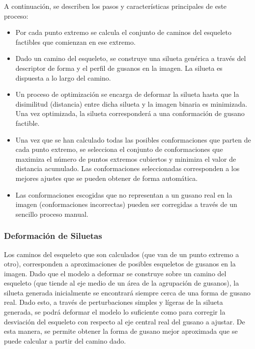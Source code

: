 A continuaci\'on, se describen los pasos y caracter\'isticas principales de este proceso:


\begin{itemize}
\item Por cada punto extremo se calcula el conjunto de caminos del esqueleto factibles
que comienzan en ese extremo.
\item Dado un camino del esqueleto, se construye una silueta gen\'erica a trav\'es
del descriptor de forma y el perfil de gusanos en la imagen. La silueta es dispuesta
a lo largo del camino.
\item Un proceso de optimizaci\'on se encarga de deformar la silueta hasta que la
disimilitud (distancia) entre dicha silueta y la imagen binaria es minimizada. Una
vez optimizada, la silueta corresponder\'a a una conformaci\'on de gusano factible.
\item Una vez que se han calculado todas las posibles conformaciones que parten 
de cada punto extremo, se selecciona el conjunto de conformaciones que maximiza
el n\'umero de puntos extremos cubiertos y minimiza el valor de distancia acumulado.
Las conformaciones seleccionadas corresponden a los mejores ajustes que se pueden
obtener de forma autom\'atica.
\item Las conformaciones escogidas que no representan a un gusano real en la imagen
(conformaciones incorrectas) pueden ser corregidas a trav\'es de un sencillo proceso
manual.
\end{itemize}

\subsubsection*{Deformaci\'on de Siluetas}
\label{sec:defsil}

Los caminos del esqueleto que son calculados (que van de un punto extremo a otro), 
corresponden a aproximaciones de posibles esqueletos de gusanos en la imagen. 
Dado que el modelo a deformar se construye sobre un camino del esqueleto
(que tiende al eje medio de un \'area de la agrupaci\'on de gusanos), la 
silueta generada inicialmente se encontrar\'a siempre cerca de una forma
de gusano real. Dado esto, a trav\'es de perturbaciones simples y l\'igeras de la silueta generada, 
se podr\'a deformar el modelo lo suficiente como para corregir la desviaci\'on del
esqueleto con respecto al eje central real del gusano a ajustar. De esta manera, se permite obtener  
la forma de gusano mejor aproximada que se puede calcular a partir del camino dado.\\

